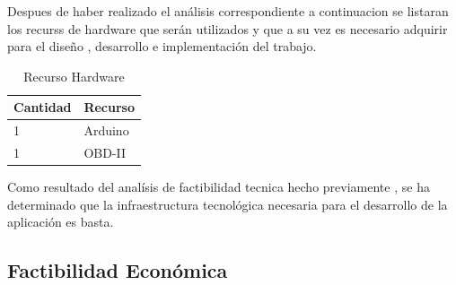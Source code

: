 Despues de haber realizado el análisis correspondiente a continuacion se listaran los recurss de hardware que serán utilizados y que a su vez es necesario adquirir para el diseño , desarrollo e implementación del trabajo.\\

\begin{table}[htbp]
		\begin{tabular}{|p{5cm}|p{7cm}|}
	\hline
		Cantidad & Recurso \\
	\hline
	\hline
		1&Arduino\\
	\hline
	\hline
		1&OBD-II \\
	\hline
				\end{tabular}
				\caption{Recurso Hardware}
				\label{disenoEstructura:rechardware}
				\end{table}
Como resultado del analísis de factibilidad tecnica hecho previamente , se ha determinado que la infraestructura tecnológica necesaria para el desarrollo de la aplicación es basta.

\subsection{Factibilidad Económica}
%
%
%
%

